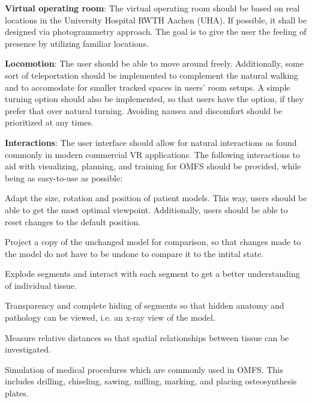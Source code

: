 \begin{compactenum}[label=(F \arabic*)]
    \item\label{req::F1} \textbf{Virtual operating room}: The virtual operating room should be based on real locations in the University Hospital RWTH Aachen (UHA).
    If possible, it shall be designed via photogrammetry approach. The goal is to give the user the feeling of presence by utilizing familiar locations.
    \item\label{req::F2} \textbf{Locomotion}: The user should be able to move around freely.
    Additionally, some sort of teleportation should be implemented to complement the natural walking and to accomodate for smaller tracked spaces in users' room setups.
    A simple turning option should also be implemented, so that users have the option, if they prefer that over natural turning.
    Avoiding nausea and discomfort should be prioritized at any times.
    \item\label{req::F3} \textbf{Interactions}: The user interface should allow for natural interactions as found commonly in modern commercial VR applications.
    The following interactions to aid with visualizing, planning, and training for OMFS should be provided, while being as easy-to-use as possible:
    \begin{compactenum}[label=(F 3.\arabic*)]
        \item \label{req::F3.1}Adapt the size, rotation and position of patient models.
        This way, users should be able to get the most optimal viewpoint.
        Additionally, users should be able to reset changes to the default position.
        \item \label{req::F3.2}Project a copy of the unchanged model for comparison, so that changes made to the model do not have to be undone to compare it to the intital state.
        \item \label{req::F3.3}Explode segments and interact with each segment to get a better understanding of individual tissue.
        \item \label{req::F3.4}Transparency and complete hiding of segments so that hidden anatomy and pathology can be viewed, i.e. an x-ray view of the model.
        \item \label{req::F3.5}Measure relative distances so that spatial relationships between tissue can be investigated.
        \item \label{req::F3.6}Simulation of medical procedures which are commonly used in OMFS.
        This includes drilling, chiseling, sawing, milling, marking, and placing osteosynthesis plates.

\end{compactenum}
\end{compactenum}
